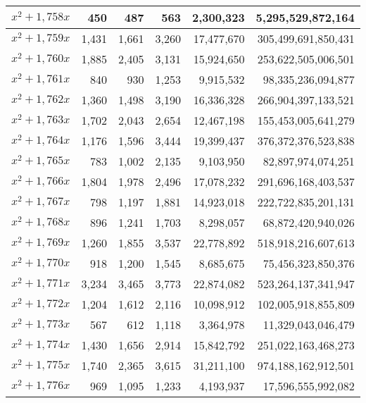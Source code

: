 \documentclass[a4paper]{amsproc}
\theoremstyle{plain}
\theoremstyle{named}
\begin{document}
\begin{longtable}{ | l | r | r | r | r | r | }
$x^2 + 1{,}758x$ & 450 & 487 & 563 & 2{,}300{,}323 & 5{,}295{,}529{,}872{,}164 \\ \hline
$x^2 + 1{,}759x$ & 1{,}431 & 1{,}661 & 3{,}260 & 17{,}477{,}670 & 305{,}499{,}691{,}850{,}431 \\ \hline
$x^2 + 1{,}760x$ & 1{,}885 & 2{,}405 & 3{,}131 & 15{,}924{,}650 & 253{,}622{,}505{,}006{,}501 \\ \hline
$x^2 + 1{,}761x$ & 840 & 930 & 1{,}253 & 9{,}915{,}532 & 98{,}335{,}236{,}094{,}877 \\ \hline
$x^2 + 1{,}762x$ & 1{,}360 & 1{,}498 & 3{,}190 & 16{,}336{,}328 & 266{,}904{,}397{,}133{,}521 \\ \hline
$x^2 + 1{,}763x$ & 1{,}702 & 2{,}043 & 2{,}654 & 12{,}467{,}198 & 155{,}453{,}005{,}641{,}279 \\ \hline
$x^2 + 1{,}764x$ & 1{,}176 & 1{,}596 & 3{,}444 & 19{,}399{,}437 & 376{,}372{,}376{,}523{,}838 \\ \hline
$x^2 + 1{,}765x$ & 783 & 1{,}002 & 2{,}135 & 9{,}103{,}950 & 82{,}897{,}974{,}074{,}251 \\ \hline
$x^2 + 1{,}766x$ & 1{,}804 & 1{,}978 & 2{,}496 & 17{,}078{,}232 & 291{,}696{,}168{,}403{,}537 \\ \hline
$x^2 + 1{,}767x$ & 798 & 1{,}197 & 1{,}881 & 14{,}923{,}018 & 222{,}722{,}835{,}201{,}131 \\ \hline
$x^2 + 1{,}768x$ & 896 & 1{,}241 & 1{,}703 & 8{,}298{,}057 & 68{,}872{,}420{,}940{,}026 \\ \hline
$x^2 + 1{,}769x$ & 1{,}260 & 1{,}855 & 3{,}537 & 22{,}778{,}892 & 518{,}918{,}216{,}607{,}613 \\ \hline
$x^2 + 1{,}770x$ & 918 & 1{,}200 & 1{,}545 & 8{,}685{,}675 & 75{,}456{,}323{,}850{,}376 \\ \hline
$x^2 + 1{,}771x$ & 3{,}234 & 3{,}465 & 3{,}773 & 22{,}874{,}082 & 523{,}264{,}137{,}341{,}947 \\ \hline
$x^2 + 1{,}772x$ & 1{,}204 & 1{,}612 & 2{,}116 & 10{,}098{,}912 & 102{,}005{,}918{,}855{,}809 \\ \hline
$x^2 + 1{,}773x$ & 567 & 612 & 1{,}118 & 3{,}364{,}978 & 11{,}329{,}043{,}046{,}479 \\ \hline
$x^2 + 1{,}774x$ & 1{,}430 & 1{,}656 & 2{,}914 & 15{,}842{,}792 & 251{,}022{,}163{,}468{,}273 \\ \hline
$x^2 + 1{,}775x$ & 1{,}740 & 2{,}365 & 3{,}615 & 31{,}211{,}100 & 974{,}188{,}162{,}912{,}501 \\ \hline
$x^2 + 1{,}776x$ & 969 & 1{,}095 & 1{,}233 & 4{,}193{,}937 & 17{,}596{,}555{,}992{,}082 \\ \hline

\end{longtable}
\end{document}
